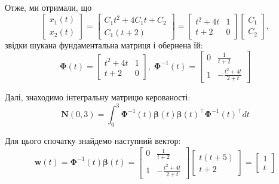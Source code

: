 \documentclass[oneside,solution]{karazin-control-assign}
\begin{document}
Отже, ми отримали, що
\begin{equation}
    \begin{bmatrix}
        x_1(t) \\ x_2(t)
    \end{bmatrix} = \begin{bmatrix}
        C_1t^2 + 4C_1t + C_2 \\
        C_1(t+2)
    \end{bmatrix} = \begin{bmatrix}
        t^2+4t & 1 \\ t+2 & 0
    \end{bmatrix}\begin{bmatrix}
        C_1 \\ C_2
    \end{bmatrix},
\end{equation}
звідки шукана фундаментальна матриця і обернена їй:
\begin{equation}
    \boldsymbol{\Phi}(t) = \begin{bmatrix}
        t^2 + 4t & 1 \\ t+2 & 0
    \end{bmatrix}, \; \boldsymbol{\Phi}^{-1}(t) = \begin{bmatrix}
        0 & \frac{1}{t+2} \\ 1 & -\frac{t^2+4t}{2+t}
    \end{bmatrix}
\end{equation}

Далі, знаходимо інтегральну матрицю керованості:
\begin{equation}
    \boldsymbol{N}(0,3) = \int_0^3 \boldsymbol{\Phi}^{-1}(t)\boldsymbol{\beta}(t)\boldsymbol{\beta}(t)^{\top}\boldsymbol{\Phi}^{-1}(t)^{\top}dt
\end{equation}

Для цього спочатку знайдемо наступний вектор:
\begin{equation}
    \mathbf{w}(t) = \boldsymbol{\Phi}^{-1}(t)\boldsymbol{\beta}(t) = \begin{bmatrix}
        0 & \frac{1}{t+2} \\ 1 & -\frac{t^2+4t}{2+t}
    \end{bmatrix}\begin{bmatrix}
        t(t+5) \\ t+2
    \end{bmatrix} = \begin{bmatrix}
        1 \\ t
    \end{bmatrix}
\end{equation}
\end{document}
